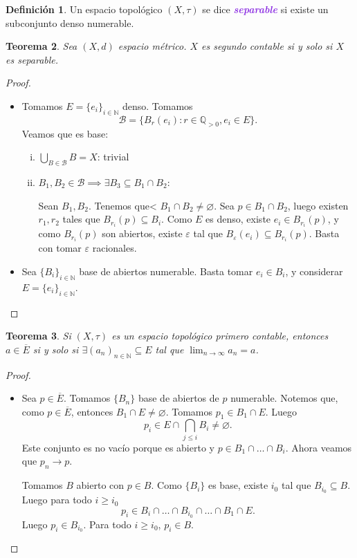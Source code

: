 \documentclass{article}
\newtheorem{theorem}{Teorema}[section]
\theoremstyle{definition}
\newtheorem{definition}[theorem]{Definición}
\theoremstyle{remark}
\numberwithin{equation}{section}
\newcommand{\B}{\mathcal{B}}
\newcommand{\N}{\mathbb{N}}
\newcommand{\Q}{\mathbb{Q}}
\newcommand{\e}{\varepsilon}
\renewcommand{\t}{\tau}
\newcommand{\oo}{\infty}
\renewcommand{\bar}{\overline}
\newcommand{\wea}[1]{\textcolor{BlueViolet}{\textbf{\emph{#1}}}}
\begin{document}
\begin{definition}
  Un espacio topológico $(X,\t)$ se dice \wea{separable} si existe un subconjunto denso numerable.
\end{definition}

\begin{theorem}
  Sea $(X,d)$ espacio métrico. $X$ es segundo contable si y solo si $X$ es separable.
\end{theorem}
\begin{proof}\
  \begin{itemize}
    \item \boxed{\impliedby} Tomamos $E = \{e_i\}_{i\in\N}$ denso. Tomamos $$\B = \{B_r(e_i) \colon r \in \Q_{>0}, e_i \in E\}.$$
    Veamos que es base:
    \begin{enumerate}[(i)]
      \item $\bigcup_{B\in\B} B = X$: trivial %
      \item $B_1, B_2\in \B \implies \exists B_3 \subseteq B_1 \cap B_2$:
      
      Sean $B_1, B_2$. Tenemos que< $B_1 \cap B_2 \neq \varnothing$. Sea $p \in B_1 \cap B_2$, luego existen $r_1,r_2$ tales que $B_{r_i}(p) \subseteq B_i$. Como $E$ es denso, existe $e_i \in B_{r_i}(p)$, y como $B_{r_i}(p)$ son abiertos, existe $\e$ tal que $B_\e(e_i) \subseteq B_{r_i}(p)$. Basta con tomar $\e$ racionales.
    \end{enumerate}

    \item \boxed{\implies} Sea $\{B_i\}_{i\in\N}$ base de abiertos numerable. Basta tomar $e_i \in B_i$, y considerar $E = \{e_i\}_{i\in\N}$.
  \end{itemize}
\end{proof}

\begin{theorem}
  Si $(X,\t)$ es un espacio topológico primero contable, entonces $a \in \bar{E}$ si y solo si $\exists (a_n)_{n\in\N} \subseteq E$ tal que $\lim_{n\to\oo} a_n = a$.
\end{theorem}
\begin{proof}\
  \begin{itemize}
    \item \boxed{\implies} Sea $p \in \bar{E}$. Tomamos $\{B_n\}$ base de abiertos de $p$ numerable. Notemos que, como $p \in \bar{E}$, entonces $B_1 \cap E \neq \varnothing$. Tomamos $p_1 \in B_1 \cap E$. Luego
    \[p_i \in E \cap \bigcap_{j\leq i} B_i \neq \varnothing.\]
    Este conjunto es no vacío porque es abierto y $p \in B_1 \cap \dots \cap B_i$.
    Ahora veamos que $p_n \to p$.

    Tomamos $B$ abierto con $p \in B$. Como $\{B_i\}$ es base, existe $i_0$ tal que $B_{i_0} \subseteq B$. Luego para todo $i \geq i_0$
    \[p_i \in B_i \cap \dots \cap B_{i_0} \cap \dots \cap B_1 \cap E.\]
    Luego $p_i \in B_{i_0}$. Para todo $i \geq i_0$, $p_i \in B$.
  \end{itemize}
\end{proof}
\end{document}
